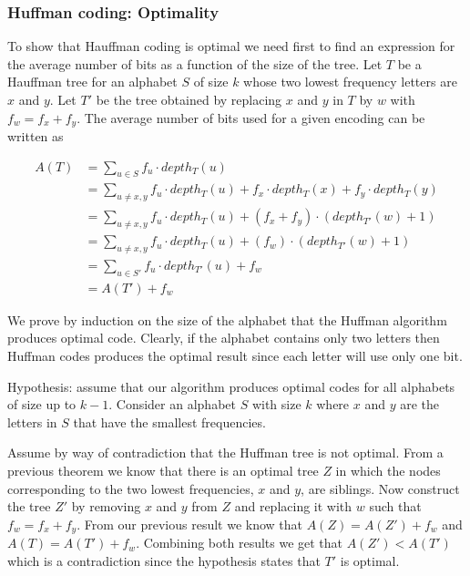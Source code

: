\documentclass{beamer}
\begin{document}
\begin{frame}
  \frametitle{Huffman coding: Optimality}
To show that Hauffman coding is optimal we need first to find an expression for the average number of bits as a function of the size of the tree. Let $T$ be a Hauffman tree for an alphabet $S$ of size $k$ whose two lowest frequency letters are $x$ and $y$. Let $T'$ be the tree obtained by replacing $x$ and $y$ in $T$ by $w$ with $f_w=f_x+f_y$. The average number of bits used for a given encoding can be written as 

\end{frame}



\begin{frame}
\begin{align*}
A(T)&=\sum_{u\in S}f_u\cdot depth_T(u)\\
 & =\sum_{u\neq x,y}f_u\cdot depth_T(u)+f_x\cdot depth_T(x)+f_y\cdot depth_T(y)\\
& =\sum_{u\neq x,y}f_u\cdot depth_T(u)+(f_x+f_y)\cdot (depth_{T'}(w)+1)\\
& =\sum_{u\neq x,y}f_u\cdot depth_T(u)+(f_w)\cdot (depth_{T'}(w)+1)\\
& =\sum_{u\in S'}f_u\cdot depth_{T'}(u)+f_w\\
&= A(T')+f_w
\end{align*}

\end{frame}
\begin{frame} 
  We prove by induction on the size of the alphabet that the Huffman algorithm produces optimal code. Clearly, if the alphabet contains only two letters then Huffman codes produces the optimal result since each letter will use only one bit.

Hypothesis: assume that our algorithm produces optimal codes for all alphabets of size up to $k-1$. Consider an alphabet $S$ with size $k$ where $x$ and $y$ are the letters in $S$ that have the smallest frequencies.

 Assume by way of contradiction that the Huffman tree is not optimal. From a previous theorem we know that there is an optimal tree $Z$ in which the nodes corresponding to the two lowest frequencies, $x$ and $y$, are siblings.  Now construct the tree $Z'$ by removing $x$ and $y$ from $Z$ and replacing it with $w$ such that $f_w=f_x+f_y$. From our previous result we know that $A(Z)=A(Z')+f_w$ and $A(T)=A(T')+f_w$. Combining both results we get that $A(Z')< A(T')$ which is a contradiction since the hypothesis states that $T'$ is optimal.
\end{frame}
\end{document}
